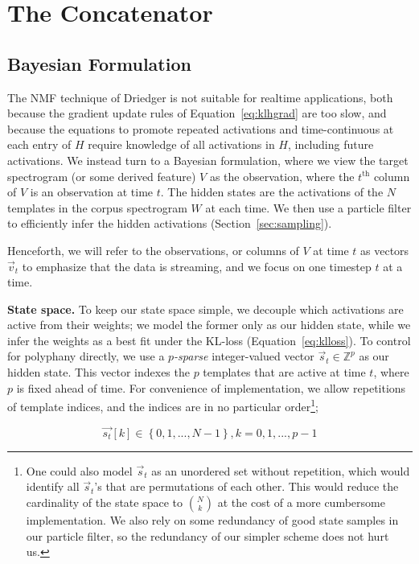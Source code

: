 \documentclass{article}
\begin{document}
\section{The Concatenator}

\subsection{Bayesian Formulation}
\label{sec:bayesian}

    The NMF technique of Driedger is not suitable for realtime applications, both because the gradient update rules of Equation~\ref{eq:klhgrad} are too slow, and because the equations to promote repeated activations and time-continuous at each entry of $H$ require knowledge of all activations in $H$, including future activations.  We instead turn to a Bayesian formulation, where we view the target spectrogram (or some derived feature) $V$ as the observation, where the $t^{\text{th}}$ column of $V$ is an observation at time $t$.  The hidden states are the activations of the $N$ templates in the corpus spectrogram $W$ at each time.  We then use a particle filter to efficiently infer the hidden activations (Section~\ref{sec:sampling}).
    
    Henceforth, we will refer to the observations, or columns of $V$ at time $t$ as vectors $\vec{v}_t$ to emphasize that the data is streaming, and we focus on one timestep $t$ at a time.  
    
    \textbf{State space.} To keep our state space simple, we decouple which activations are active from their weights; we model the former only as our hidden state, while we infer the weights as a best fit under the KL-loss (Equation~\ref{eq:klloss}).  To control for polyphany directly, we use a {\em $p$-sparse} integer-valued vector $\vec{s}_t \in \mathbb{Z}^p$ as our hidden state.  This vector indexes the $p$ templates that are active at time $t$, where $p$ is fixed ahead of time.  For convenience of implementation, we allow repetitions of template indices, and the indices are in no particular order\footnote{One could also model $\vec{s}_t$ as an unordered set without repetition, which would identify all $\vec{s}_t$'s that are permutations of each other.  This would reduce the cardinality of the state space to $\binom{N}{k}$ at the cost of a more cumbersome implementation.  We also rely on some redundancy of good state samples in our particle filter, so the redundancy of our simpler scheme does not hurt us.};

    \begin{equation} 
        \label{eq:statevector}
        \vec{s_t}[k] \in \left\{0, 1, ..., N-1\right\}, k = 0, 1, ..., p-1 
    \end{equation}
\end{document}
